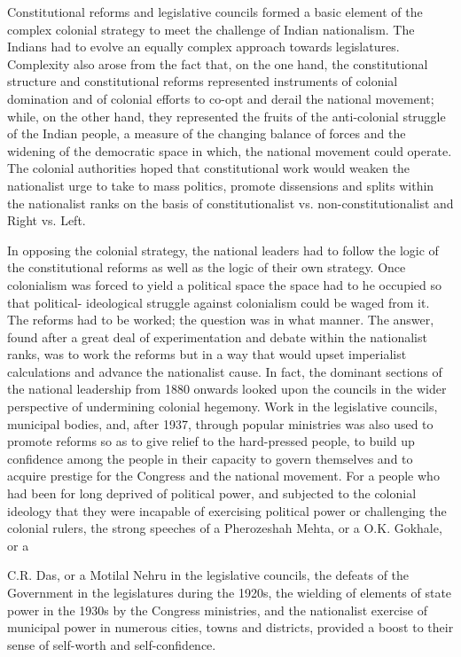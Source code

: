 Constitutional reforms and legislative councils formed a basic element of the complex colonial strategy to meet the challenge of Indian nationalism. The Indians had to evolve an equally complex approach towards legislatures. Complexity also arose from the fact that, on the one hand, the constitutional structure and constitutional reforms represented instruments of colonial domination and of colonial efforts to co-opt and derail the national movement; while, on the other hand, they represented the fruits of the anti-colonial struggle of the Indian people, a measure of the changing balance of forces and the widening of the democratic space in which, the national movement could operate. The colonial authorities hoped that constitutional work would weaken the nationalist urge to take to mass politics, promote dissensions and splits within the nationalist ranks on the basis of constitutionalist vs. non-constitutionalist and Right vs. Left.

In opposing the colonial strategy, the national leaders had to follow the logic of the constitutional reforms as well as the logic of their own strategy. Once colonialism was forced to yield a political space the space had to he occupied so that political- ideological struggle against colonialism could be waged from it. The reforms had to be worked; the question was in what manner. The answer, found after a great deal of experimentation and debate within the nationalist ranks, was to work the reforms but in a way that would upset imperialist calculations and advance the nationalist cause. In fact, the dominant sections of the national leadership from 1880 onwards looked upon the councils in the wider perspective of undermining colonial hegemony. Work in the legislative councils, municipal bodies, and, after 1937, through popular ministries was also used to promote reforms so as to give relief to the hard-pressed people, to build up confidence among the people in their capacity to govern themselves and to acquire prestige for the Congress and the national movement. For a people who had been for long deprived of political power, and subjected to the colonial ideology that they were incapable of exercising political power or challenging the colonial rulers, the strong speeches of a Pherozeshah Mehta, or a O.K. Gokhale, or a

C.R. Das, or a Motilal Nehru in the legislative councils, the defeats of the Government in the legislatures during the 1920s, the wielding of elements of state power in the 1930s by the Congress ministries, and the nationalist exercise of municipal power in numerous cities, towns and districts, provided a boost to their sense of self-worth and self-confidence.

